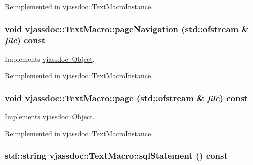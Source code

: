 Reimplemented in \hyperlink{classvjassdoc_1_1TextMacroInstance_e60b03ce172f8eefde2cdcc31533ee2d}{vjassdoc::TextMacroInstance}.\hypertarget{classvjassdoc_1_1TextMacro_d3ad5fe5300492db3d1aaf250d9b2a4b}{
\subsubsection{\setlength{\rightskip}{0pt plus 5cm}void vjassdoc::TextMacro::pageNavigation (std::ofstream \& {\em file}) const}}
\label{classvjassdoc_1_1TextMacro_d3ad5fe5300492db3d1aaf250d9b2a4b}




Implements \hyperlink{classvjassdoc_1_1Object_736bbb6719edd8070d8f56c364a2764c}{vjassdoc::Object}.

Reimplemented in \hyperlink{classvjassdoc_1_1TextMacroInstance_2bc8e5c94f5a74795d0c2d8137522d89}{vjassdoc::TextMacroInstance}.\hypertarget{classvjassdoc_1_1TextMacro_3336cdf9ad953dbd44b38fb14a2f73fa}{
\subsubsection{\setlength{\rightskip}{0pt plus 5cm}void vjassdoc::TextMacro::page (std::ofstream \& {\em file}) const}}
\label{classvjassdoc_1_1TextMacro_3336cdf9ad953dbd44b38fb14a2f73fa}




Implements \hyperlink{classvjassdoc_1_1Object_a0489e38956f3507566b1bc6e3e2c8af}{vjassdoc::Object}.

Reimplemented in \hyperlink{classvjassdoc_1_1TextMacroInstance_4785937fa62c12f3586276a2d5dcbe52}{vjassdoc::TextMacroInstance}.\hypertarget{classvjassdoc_1_1TextMacro_e46c88feedc6197fbbae48de17f07366}{
\subsubsection{\setlength{\rightskip}{0pt plus 5cm}std::string vjassdoc::TextMacro::sqlStatement () const}}
\label{classvjassdoc_1_1TextMacro_e46c88feedc6197fbbae48de17f07366}




